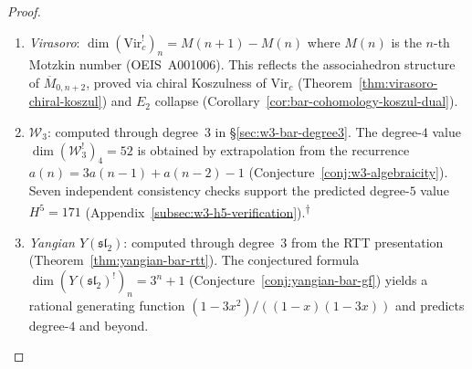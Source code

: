 \begin{proof}
\begin{enumerate}
\item \emph{Virasoro}:
  $\dim (\mathrm{Vir}_c^!)_n = M(n{+}1) - M(n)$
  where $M(n)$ is the $n$-th Motzkin number
  (OEIS~A001006).  This reflects the associahedron
  structure of $\overline{M}_{0,n+2}$, proved via
  chiral Koszulness of $\mathrm{Vir}_c$
  (Theorem~\ref{thm:virasoro-chiral-koszul}) and
  $E_2$ collapse
  (Corollary~\ref{cor:bar-cohomology-koszul-dual}).
\item \emph{$\mathcal{W}_3$}: computed through degree~$3$
  in \S\ref{sec:w3-bar-degree3}.  The degree-$4$ value
  $\dim (\mathcal{W}_3^!)_4 = 52$ is obtained by extrapolation from the
  recurrence $a(n) = 3a(n{-}1) + a(n{-}2) - 1$
  (Conjecture~\ref{conj:w3-algebraicity}).
  Seven independent consistency checks support the predicted degree-$5$
  value $H^5 = 171$
  (Appendix~\ref{subsec:w3-h5-verification}).\textsuperscript{$\dagger$}
\item \emph{Yangian $Y(\mathfrak{sl}_2)$}: computed through
  degree~$3$ from the RTT presentation
  (Theorem~\ref{thm:yangian-bar-rtt}).
  The conjectured formula $\dim (Y(\mathfrak{sl}_2)^!)_n = 3^n + 1$
  (Conjecture~\ref{conj:yangian-bar-gf})
  yields a rational generating function
  $(1-3x^2)/((1-x)(1-3x))$
  and predicts degree-$4$ and beyond.
\end{enumerate}
\end{proof}

